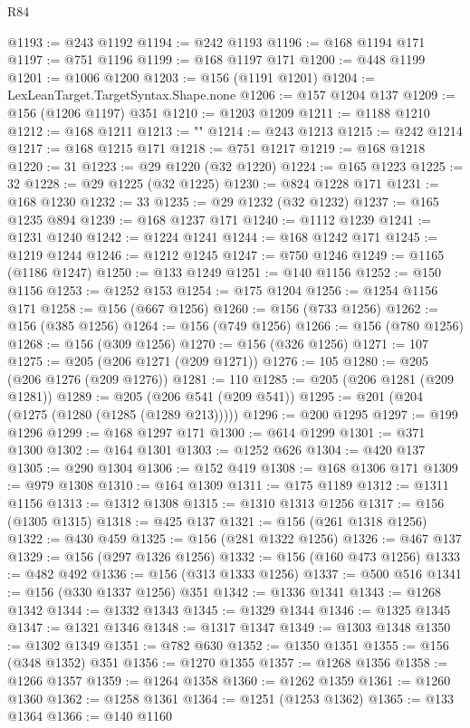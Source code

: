 \begin{lexlean}{R84}
\begin{coremodule}
{@1193 := @243 @1192
@1194 := @242 @1193
@1196 := @168 @1194 @171
@1197 := @751 @1196
@1199 := @168 @1197 @171
@1200 := @448 @1199
@1201 := @1006 @1200
@1203 := @156 (@1191 @1201)
@1204 := LexLeanTarget.TargetSyntax.Shape.none
@1206 := @157 @1204 @137
@1209 := @156 (@1206 @1197) @351
@1210 := @1203 @1209
@1211 := @1188 @1210
@1212 := @168 @1211
@1213 := "}"
@1214 := @243 @1213
@1215 := @242 @1214
@1217 := @168 @1215 @171
@1218 := @751 @1217
@1219 := @168 @1218
@1220 := 31
@1223 := @29 @1220 (@32 @1220)
@1224 := @165 @1223
@1225 := 32
@1228 := @29 @1225 (@32 @1225)
@1230 := @824 @1228 @171
@1231 := @168 @1230
@1232 := 33
@1235 := @29 @1232 (@32 @1232)
@1237 := @165 @1235 @894
@1239 := @168 @1237 @171
@1240 := @1112 @1239
@1241 := @1231 @1240
@1242 := @1224 @1241
@1244 := @168 @1242 @171
@1245 := @1219 @1244
@1246 := @1212 @1245
@1247 := @750 @1246
@1249 := @1165 (@1186 @1247)
@1250 := @133 @1249
@1251 := @140 @1156
@1252 := @150 @1156
@1253 := @1252 @153
@1254 := @175 @1204
@1256 := @1254 @1156 @171
@1258 := @156 (@667 @1256)
@1260 := @156 (@733 @1256)
@1262 := @156 (@385 @1256)
@1264 := @156 (@749 @1256)
@1266 := @156 (@780 @1256)
@1268 := @156 (@309 @1256)
@1270 := @156 (@326 @1256)
@1271 := 107
@1275 := @205 (@206 @1271 (@209 @1271))
@1276 := 105
@1280 := @205 (@206 @1276 (@209 @1276))
@1281 := 110
@1285 := @205 (@206 @1281 (@209 @1281))
@1289 := @205 (@206 @541 (@209 @541))
@1295 := @201 (@204 (@1275 (@1280 (@1285 (@1289 @213)))))
@1296 := @200 @1295
@1297 := @199 @1296
@1299 := @168 @1297 @171
@1300 := @614 @1299
@1301 := @371 @1300
@1302 := @164 @1301
@1303 := @1252 @626
@1304 := @420 @137
@1305 := @290 @1304
@1306 := @152 @419
@1308 := @168 @1306 @171
@1309 := @979 @1308
@1310 := @164 @1309
@1311 := @175 @1189
@1312 := @1311 @1156
@1313 := @1312 @1308
@1315 := @1310 @1313 @1256
@1317 := @156 (@1305 @1315)
@1318 := @425 @137
@1321 := @156 (@261 @1318 @1256)
@1322 := @430 @459
@1325 := @156 (@281 @1322 @1256)
@1326 := @467 @137
@1329 := @156 (@297 @1326 @1256)
@1332 := @156 (@160 @473 @1256)
@1333 := @482 @492
@1336 := @156 (@313 @1333 @1256)
@1337 := @500 @516
@1341 := @156 (@330 @1337 @1256) @351
@1342 := @1336 @1341
@1343 := @1268 @1342
@1344 := @1332 @1343
@1345 := @1329 @1344
@1346 := @1325 @1345
@1347 := @1321 @1346
@1348 := @1317 @1347
@1349 := @1303 @1348
@1350 := @1302 @1349
@1351 := @782 @630
@1352 := @1350 @1351
@1355 := @156 (@348 @1352) @351
@1356 := @1270 @1355
@1357 := @1268 @1356
@1358 := @1266 @1357
@1359 := @1264 @1358
@1360 := @1262 @1359
@1361 := @1260 @1360
@1362 := @1258 @1361
@1364 := @1251 (@1253 @1362)
@1365 := @133 @1364
@1366 := @140 @1160

\end{coremodule}
\end{lexlean}
